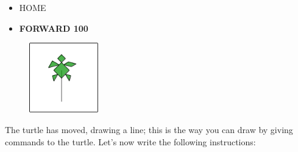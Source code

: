 \begin{scriptsize}
\begin{minipage}{0.45\textwidth}
\begin{itemize}[itemsep=-3pt,parsep=2pt]
\item[] \hspace{0.5cm} HOME 
\item[] \hspace{0.5cm} \textbf{FORWARD 100}
\end{itemize}
\end{minipage}
\end{scriptsize}
\begin{minipage}{0.5\textwidth}
\begin{figure}[H]
   \includegraphics[width=3.0cm,trim=4 4 8 4,clip]{./images/disegnare/disegnare-2.png}
   \label{dis-2}
\end{figure}
\end{minipage} \hfill

\vskip 1cm

The turtle has moved, drawing a line; this is the way you can draw by giving commands to the turtle.
Let's now write the following instructions:

\vskip 1cm

